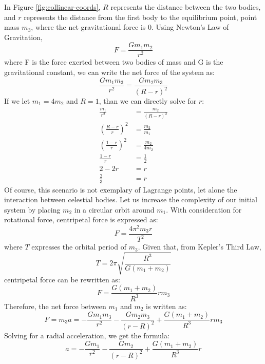 In Figure \ref{fig:collinear-coords}, $R$ represents the distance between the two bodies, and $r$ represents the distance from the first body to the equilibrium point, point mass $m_3$, where the net gravitational force is 0. Using Newton's Law of Gravitation,
\begin{equation*}
	F = \frac{Gm_1m_2}{r^2}
\end{equation*}
where F is the force exerted between two bodies of mass and G is the gravitational constant, we can write the net force of the system as:
\begin{equation*}
	\frac{Gm_1m_3}{r^2} = \frac{Gm_2m_3}{(R - r)^2}
\end{equation*}
If we let $m_1 = 4m_2$ and $R = 1$, than we can directly solve for $r$:
\begin{align*}
	\frac{m_1}{r^2} &= \frac{m_2}{(R - r)^2} \\
	\left(\frac{R - r}{r}\right)^2 &= \frac{m_2}{m_1} \\
	\left(\frac{1 - r}{r}\right)^2 &= \frac{m_2}{4m_2} \\
	\frac{1 - r}{r} &= \frac{1}{2} \\
	2 - 2r &= r \\
	\frac{2}{3} &= r
\end{align*}
Of course, this scenario is not exemplary of Lagrange points, let alone the interaction between celestial bodies. Let us increase the complexity of our initial system by placing $m_2$ in a circular orbit around $m_1$. With consideration for rotational force, centripetal force is expressed as:
\begin{equation*}
	F = \frac{4\pi^2m_3r}{T^2}
\end{equation*}
where $T$ expresses the orbital period of $m_3$. Given that, from Kepler's Third Law,
\begin{equation*}
	T = 2\pi \sqrt{\frac{R^3}{G(m_1 + m_2)}}
\end{equation*}
centripetal force can be rewritten as:
\begin{equation*}
	F = \frac{G(m_1+m_2)}{R^3}rm_3
\end{equation*}
Therefore, the net force between $m_1$ and $m_2$ is written as:
\begin{equation*}
	F = m_3a = -\frac{Gm_1m_3}{r^2} - \frac{Gm_2m_3}{(r - R)^2} + \frac{G(m_1+m_2)}{R^3}rm_3
\end{equation*}
Solving for a radial acceleration, we get the formula:
\begin{equation*}
	a = -\frac{Gm_1}{r^2} - \frac{Gm_2}{(r - R)^2} + \frac{G(m_1+m_2)}{R^3}r
\end{equation*}
